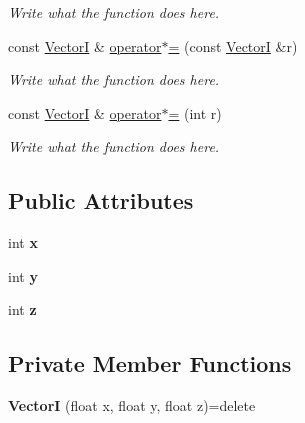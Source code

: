 \begin{DoxyCompactItemize}
\begin{DoxyCompactList}\small\item\em Write what the function does here. \end{DoxyCompactList}\item 
const \hyperlink{structVectorI}{Vector\+I} \& \hyperlink{structVectorI_a8f22c2de2c8daddc1765b77a6c2b677b}{operator$\ast$=} (const \hyperlink{structVectorI}{Vector\+I} \&r)
\begin{DoxyCompactList}\small\item\em Write what the function does here. \end{DoxyCompactList}\item 
const \hyperlink{structVectorI}{Vector\+I} \& \hyperlink{structVectorI_aae795a0dad05eba4e9aa4dce4df2d66a}{operator$\ast$=} (int r)
\begin{DoxyCompactList}\small\item\em Write what the function does here. \end{DoxyCompactList}\end{DoxyCompactItemize}
\subsection*{Public Attributes}
\begin{DoxyCompactItemize}
\item 
\hypertarget{structVectorI_a1ad1dc3cfb9e92768acfdd55a5a03dd3}{int {\bfseries x}}\label{structVectorI_a1ad1dc3cfb9e92768acfdd55a5a03dd3}

\item 
\hypertarget{structVectorI_abe21d4e3b37805d5d71af46902b9d8ad}{int {\bfseries y}}\label{structVectorI_abe21d4e3b37805d5d71af46902b9d8ad}

\item 
\hypertarget{structVectorI_a719998755aaf910545bf2bbacb5c9306}{int {\bfseries z}}\label{structVectorI_a719998755aaf910545bf2bbacb5c9306}

\end{DoxyCompactItemize}
\subsection*{Private Member Functions}
\begin{DoxyCompactItemize}
\item 
\hypertarget{structVectorI_a391ea795b68954ca116d9529bcd777d5}{{\bfseries Vector\+I} (float x, float y, float z)=delete}\label{structVectorI_a391ea795b68954ca116d9529bcd777d5}

\end{DoxyCompactItemize}
